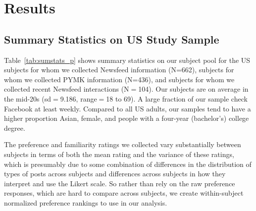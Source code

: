 \documentclass[12pt,letterpaper]{article}
\newcommand{\FullNFUSSurveySampleSize}{662}
\newcommand{\PYMKUSSurveySampleSize}{436}
\newcommand{\NFnPYMKIndiaSurveySampleSize}{200}
\newcommand{\RecentInteractionsSampleSize}{104}
\begin{document}


\section{Results}

\subsection{Summary Statistics on US Study Sample}

Table~\ref{tab:sumstats_p} shows summary statistics on our subject pool for the US subjects for whom we collected Newsfeed information (N=\FullNFUSSurveySampleSize{}), subjects for whom we collected PYMK information (N=\PYMKUSSurveySampleSize{}), and subjects for whom we collected recent Newsfeed interactions (N$=$\RecentInteractionsSampleSize).  Our subjects are on average in the mid-20s (sd$=$9.186, range$=$18 to 69).  A large fraction of our sample check Facebook at least weekly. Compared to all US adults, our samples tend to have a higher proportion Asian, female, and people with a four-year (bachelor's) college degree. 

The preference and familiarity ratings we collected vary substantially between subjects in terms of both the mean rating and the variance of these ratings, which is presumably due to some combination of differences in the distribution of types of posts across subjects and differences across subjects in how they interpret and use the Likert scale. So rather than rely on the raw preference responses, which are hard to compare across subjects, we create within-subject normalized preference rankings to use in our analysis. 
\end{document}
